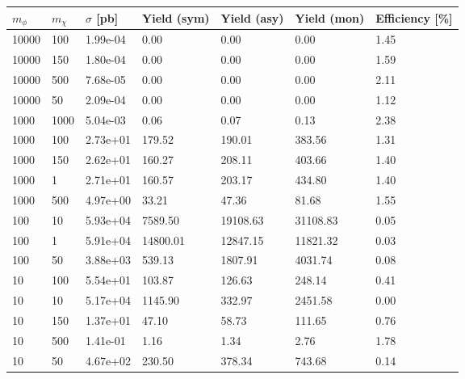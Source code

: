\begin{table}
\small
\centering
\begin{tabular}{lllllll}
\hline
$m_\phi$ & $m_\chi$ & $\sigma$ [pb] & Yield (sym) & Yield (asy) & Yield (mon) & Efficiency [\%] \\ \hline
10000     &   100       &   1.99e-04  &   0.00      &   0.00      &   0.00      &   1.45      \\ 
10000     &   150       &   1.80e-04  &   0.00      &   0.00      &   0.00      &   1.59      \\ 
10000     &   500       &   7.68e-05  &   0.00      &   0.00      &   0.00      &   2.11      \\ 
10000     &   50        &   2.09e-04  &   0.00      &   0.00      &   0.00      &   1.12      \\ 
1000      &   1000      &   5.04e-03  &   0.06      &   0.07      &   0.13      &   2.38      \\ 
1000      &   100       &   2.73e+01  &   179.52    &   190.01    &   383.56    &   1.31      \\ 
1000      &   150       &   2.62e+01  &   160.27    &   208.11    &   403.66    &   1.40      \\ 
1000      &   1         &   2.71e+01  &   160.57    &   203.17    &   434.80    &   1.40      \\ 
1000      &   500       &   4.97e+00  &   33.21     &   47.36     &   81.68     &   1.55      \\ 
100       &   10        &   5.93e+04  &   7589.50   &   19108.63  &   31108.83  &   0.05      \\ 
100       &   1         &   5.91e+04  &   14800.01  &   12847.15  &   11821.32  &   0.03      \\ 
100       &   50        &   3.88e+03  &   539.13    &   1807.91   &   4031.74   &   0.08      \\ 
10        &   100       &   5.54e+01  &   103.87    &   126.63    &   248.14    &   0.41      \\ 
10        &   10        &   5.17e+04  &   1145.90   &   332.97    &   2451.58   &   0.00      \\ 
10        &   150       &   1.37e+01  &   47.10     &   58.73     &   111.65    &   0.76      \\ 
10        &   500       &   1.41e-01  &   1.16      &   1.34      &   2.76      &   1.78      \\ 
10        &   50        &   4.67e+02  &   230.50    &   378.34    &   743.68    &   0.14      \\ 

\end{tabular}
\end{table}
